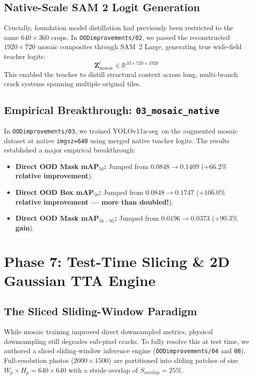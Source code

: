 \documentclass[11pt,a4paper]{article}
\newcommand{\yolo}{YOLOv11n-seg}
\newcommand{\sam}{SAM~2 Large}
\begin{document}
\subsection{Native-Scale SAM 2 Logit Generation}
Crucially, foundation model distillation had previously been restricted to the same $640\times360$ crops. 
In \texttt{OODimprovements/02}, we passed the reconstructed $1920\times720$ mosaic composites through \sam, generating true wide-field teacher logits:
\begin{equation}
  \mathbf{Z}^t_{\text{mosaic}} \in \mathbb{R}^{M \times 720 \times 1920}
\end{equation}
This enabled the teacher to distill structural context across long, multi-branch crack systems spanning multiple original tiles.

\subsection{Empirical Breakthrough: \texttt{03\_mosaic\_native}}
In \texttt{OODimprovements/03}, we trained \yolo\ on the augmented mosaic dataset at native \texttt{imgsz=640} using merged native teacher logits.
The results established a major empirical breakthrough:
\begin{itemize}[leftmargin=1.5em]
  \item \textbf{Direct OOD Mask mAP$_{50}$:} Jumped from $0.0848 \to \mathbf{0.1409}$ (\textbf{$+66.2\%$ relative improvement}).
  \item \textbf{Direct OOD Box mAP$_{50}$:} Jumped from $0.0848 \to \mathbf{0.1747}$ (\textbf{$+106.0\%$ relative improvement --- more than doubled!}).
  \item \textbf{Direct OOD Mask mAP$_{50-95}$:} Jumped from $0.0196 \to \mathbf{0.0373}$ (\textbf{$+90.3\%$ gain}).
\end{itemize}

\section{Phase 7: Test-Time Slicing \& 2D Gaussian TTA Engine}
\label{sec:phase7}

\subsection{The Sliced Sliding-Window Paradigm}
While mosaic training improved direct downsampled metrics, physical downsampling still degrades sub-pixel cracks. 
To fully resolve this at test time, we authored a sliced sliding-window inference engine (\texttt{OODimprovements/04} and \texttt{08}). 
Full-resolution photos ($2000\times1500$) are partitioned into sliding patches of size $W_p \times H_p = 640\times640$ with a stride overlap of $S_{\text{overlap}} = 25\%$.
\end{document}
